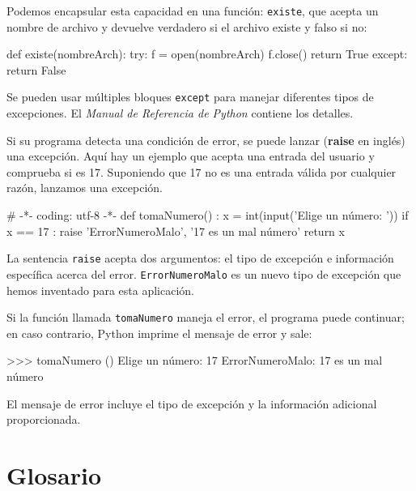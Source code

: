 Podemos encapsular esta capacidad en una función: \texttt{existe},
que acepta un nombre de archivo y devuelve verdadero si el archivo
existe y falso si no:
\begin{pythoncode}
def existe(nombreArch):
  try:
    f = open(nombreArch)
    f.close()
    return True
  except:
    return False
\end{pythoncode}
Se pueden usar múltiples bloques \texttt{except} para manejar diferentes
tipos de excepciones. El {\em Manual de Referencia de Python} contiene
los detalles.

Si su programa detecta una condición de error, se puede lanzar (\textbf{raise}
en inglés) una excepción. Aquí hay un ejemplo que acepta una entrada
del usuario y comprueba si es 17. Suponiendo que 17 no es una entrada
válida por cualquier razón, lanzamos una excepción.
\begin{pythoncode}
# -*- coding: utf-8 -*-
def tomaNumero() :                 
  x = int(input('Elige un número: '))
  if x == 17 :
    raise 'ErrorNumeroMalo', '17 es un mal número'
  return x
\end{pythoncode}

La sentencia \texttt{raise} acepta dos argumentos: el tipo de excepción
e información específica acerca del error. \texttt{ErrorNumeroMalo}
es un nuevo tipo de excepción que hemos inventado para esta aplicación.

Si la función llamada \texttt{tomaNumero} maneja el error, el programa
puede continuar; en caso contrario, Python imprime el mensaje de error
y sale:
\begin{pyconcode}
>>> tomaNumero ()
Elige un número: 17
ErrorNumeroMalo: 17 es un mal número
\end{pyconcode}

El mensaje de error incluye el tipo de excepción y la información
adicional proporcionada.

\section{Glosario}

